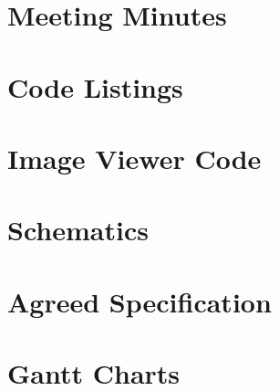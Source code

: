\documentclass[oneside]{ecsgdp}         %
\begin{document}



\newpage

\appendix
\chapter{Meeting Minutes}

\newpage

\chapter{Code Listings}
\label{chap:Matlab_code}

\newpage
\chapter{Image Viewer Code}

\newpage

\newpage

\newpage
\chapter{Schematics}


\newpage

\chapter{Agreed Specification}

\newpage

\chapter{Gantt Charts}

\newpage

\backmatter



\end{document}
